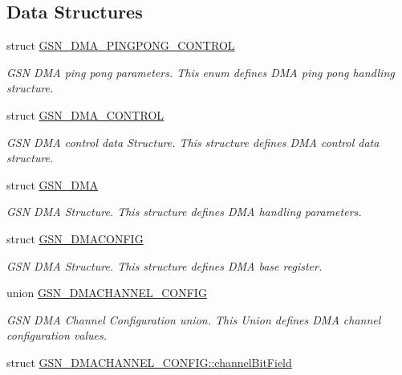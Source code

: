 \subsection*{Data Structures}
\begin{DoxyCompactItemize}
\item 
struct \hyperlink{a00051}{GSN\_\-DMA\_\-PINGPONG\_\-CONTROL}
\begin{DoxyCompactList}\small\item\em GSN DMA ping pong parameters. This enum defines DMA ping pong handling structure. \end{DoxyCompactList}\item 
struct \hyperlink{a00050}{GSN\_\-DMA\_\-CONTROL}
\begin{DoxyCompactList}\small\item\em GSN DMA control data Structure. This structure defines DMA control data structure. \end{DoxyCompactList}\item 
struct \hyperlink{a00049}{GSN\_\-DMA}
\begin{DoxyCompactList}\small\item\em GSN DMA Structure. This structure defines DMA handling parameters. \end{DoxyCompactList}\item 
struct \hyperlink{a00053}{GSN\_\-DMACONFIG}
\begin{DoxyCompactList}\small\item\em GSN DMA Structure. This structure defines DMA base register. \end{DoxyCompactList}\item 
union \hyperlink{a00052}{GSN\_\-DMACHANNEL\_\-CONFIG}
\begin{DoxyCompactList}\small\item\em GSN DMA Channel Configuration union. This Union defines DMA channel configuration values. \end{DoxyCompactList}\item 
struct \hyperlink{a00010}{GSN\_\-DMACHANNEL\_\-CONFIG::channelBitField}
\end{DoxyCompactItemize}
